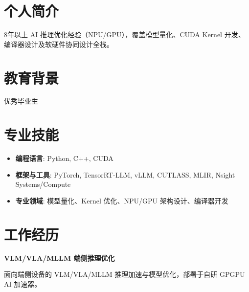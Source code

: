 \documentclass{resume_zh}
\begin{document}



\section{个人简介}
8年以上 AI 推理优化经验（NPU/GPU），覆盖模型量化、CUDA Kernel 开发、编译器设计及软硬件协同设计全栈。

\section{教育背景}
优秀毕业生

\section{专业技能}
\begin{itemize}[parsep=0.5ex]
  \item \textbf{编程语言}: Python, C++, CUDA
  \item \textbf{框架与工具}: PyTorch, TensorRT-LLM, vLLM, CUTLASS, MLIR, Nsight Systems/Compute
  \item \textbf{专业领域}: 模型量化、Kernel 优化、NPU/GPU 架构设计、编译器开发
\end{itemize}

\section{工作经历}

\textbf{VLM/VLA/MLLM 端侧推理优化}

面向端侧设备的 VLM/VLA/MLLM 推理加速与模型优化，部署于自研 GPGPU AI 加速器。
\end{document}
